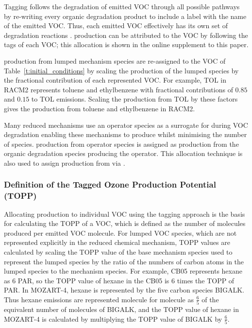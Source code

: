 Tagging follows the degradation of emitted VOC through all possible pathways by re-writing every organic degradation product to include a label with the name of the emitted VOC.
Thus, each emitted VOC effectively has its own set of degradation reactions \citep{Butler:2011}.
 production can be attributed to the VOC by following the tags of each VOC; this allocation is shown in the online supplement to this paper.

 production from lumped mechanism species are re-assigned to the VOC of \mbox{Table \ref{t:initial_conditions}} by scaling the  production of the lumped species by the fractional contribution of each represented VOC.
For example, TOL in RACM2 represents toluene and ethylbenzene with fractional contributions of $0.85$ and $0.15$ to TOL emissions.
Scaling the  production from TOL by these factors gives the  production from toluene and ethylbenzene in RACM2.

Many reduced mechanisms use an operator species as a surrogate for  during VOC degradation enabling these mechanisms to produce  whilst minimising the number of  species.
 production from operator species is assigned as  production from the organic degradation species producing the operator.
This allocation technique is also used to assign  production from  via .
%
\subsubsection{Definition of the Tagged Ozone Production Potential (TOPP)} \label{sss:TOPP} %
%
Allocating  production to individual VOC using the tagging approach is the basis for calculating the TOPP of a VOC, which is defined as the number of  molecules produced per emitted VOC molecule.
For lumped VOC species, which are not represented explicitly in the reduced chemical mechanism, TOPP values are calculated by scaling the TOPP value of the base mechanism species used to represent the lumped species by the ratio of the numbers of carbon atoms in the lumped species to the mechanism species.
For example, CB05 represents hexane as $6$ PAR, so the TOPP value of hexane in the CB05 is $6$ times the TOPP of PAR.
In MOZART-4, hexane is represented by the five carbon species BIGALK.
Thus hexane emissions are represented molecule for molecule as $\frac{6}{5}$ of the equivalent number of molecules of BIGALK, and the TOPP value of hexane in MOZART-4 is calculated by multiplying the TOPP value of BIGALK by $\frac{6}{5}$.
